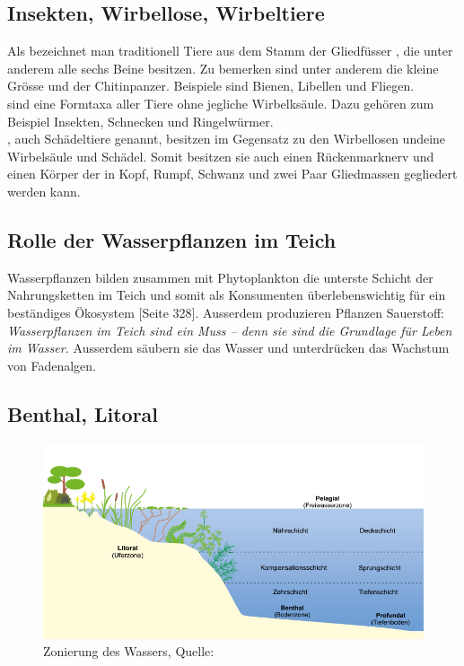 \documentclass{article}
\begin{document}
    \subsection{Insekten, Wirbellose, Wirbeltiere}
    
        Als  bezeichnet man traditionell Tiere aus dem Stamm der Gliedfüsser , die unter anderem alle sechs Beine besitzen. Zu bemerken sind unter anderem die kleine Grösse und der Chitinpanzer. Beispiele sind Bienen, Libellen und Fliegen. \cite{EvolutionofInsects} \\
        \vspace{5mm}
         sind eine Formtaxa \cite{UniProtokolle} aller Tiere ohne jegliche Wirbelksäule. Dazu gehören zum Beispiel Insekten, Schnecken und Ringelwürmer. \cite{FrustfreiLernen} \\
        \vspace{5mm}
        , auch Schädeltiere genannt,  besitzen im Gegensatz zu den Wirbellosen undeine Wirbelsäule und Schädel. Somit besitzen sie auch einen Rückenmarknerv und einen Körper der in Kopf, Rumpf, Schwanz und zwei Paar Gliedmassen gegliedert werden kann. \cite{Lernhelfer}
        
    \subsection{Rolle der Wasserpflanzen im Teich}
    
        Wasserpflanzen bilden zusammen mit Phytoplankton die unterste Schicht der Nahrungsketten im Teich und somit als Konsumenten überlebenswichtig für ein beständiges Ökosystem \cite{Biobuch} [Seite 328]. Ausserdem produzieren Pflanzen Sauerstoff: \textit{Wasserpflanzen im Teich sind ein Muss – denn sie sind die Grundlage für Leben im Wasser.}  Ausserdem säubern sie das Wasser und unterdrücken das Wachstum von Fadenalgen. \cite{Lupos}
    
    \subsection{Benthal, Litoral}
    
        \begin{figure}[h!]
        \centering
        \includegraphics[scale=0.4]{zonierung.jpg}
        \caption{Zonierung des Wassers, Quelle: \cite{klasseWasser}}
        \label{fig:universe}
        \end{figure}
        
\end{document}
